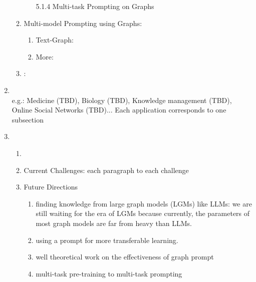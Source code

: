 \begin{enumerate}[1]
\begin{enumerate}[5.1]
\begin{enumerate}[5.1.1]
        \item [5.1.4] Multi-task Prompting on Graphs
    \end{enumerate}
    \item Multi-model Prompting using Graphs: \\
    \begin{enumerate}[5.2.1]
        \item Text-Graph: 
        \item More: 
    \end{enumerate}
    \item {}: 
\end{enumerate}
\item {}
\\ e.g.: Medicine (TBD),  Biology (TBD), Knowledge management (TBD), Online Social Networks (TBD)... Each application corresponds to one subsection
\item {}
\\
\begin{enumerate}[7.1]
    \item {}
    \item Current Challenges: each paragraph to each challenge
    \item Future Directions
    \begin{enumerate}[7.3.1]
        \item finding knowledge from large graph models (LGMs) like LLMs: we are still waiting for the era of LGMs because currently, the parameters of most graph models are far from heavy than LLMs.
        \item using a prompt for more transferable learning.
        \item well theoretical work on the effectiveness of graph prompt
        \item multi-task pre-training to multi-task prompting

\end{enumerate}
\end{enumerate}
\end{enumerate}
